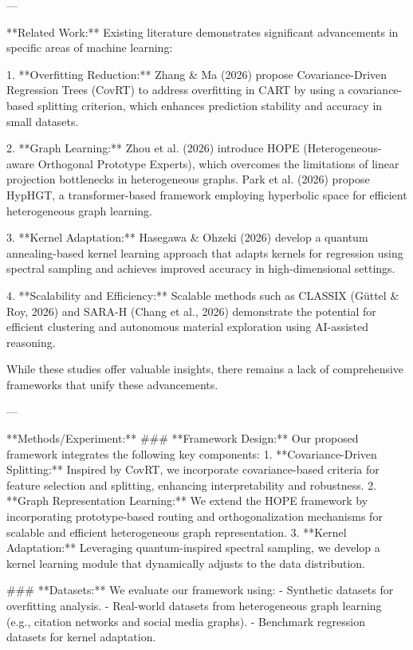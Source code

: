 ---

**Related Work:**  
Existing literature demonstrates significant advancements in specific areas of machine learning:  

1. **Overfitting Reduction:**  
Zhang & Ma (2026) propose Covariance-Driven Regression Trees (CovRT) to address overfitting in CART by using a covariance-based splitting criterion, which enhances prediction stability and accuracy in small datasets.  

2. **Graph Learning:**  
Zhou et al. (2026) introduce HOPE (Heterogeneous-aware Orthogonal Prototype Experts), which overcomes the limitations of linear projection bottlenecks in heterogeneous graphs. Park et al. (2026) propose HypHGT, a transformer-based framework employing hyperbolic space for efficient heterogeneous graph learning.  

3. **Kernel Adaptation:**  
Hasegawa & Ohzeki (2026) develop a quantum annealing-based kernel learning approach that adapts kernels for regression using spectral sampling and achieves improved accuracy in high-dimensional settings.  

4. **Scalability and Efficiency:**  
Scalable methods such as CLASSIX (Güttel & Roy, 2026) and SARA-H (Chang et al., 2026) demonstrate the potential for efficient clustering and autonomous material exploration using AI-assisted reasoning.  

While these studies offer valuable insights, there remains a lack of comprehensive frameworks that unify these advancements.  

---

**Methods/Experiment:**  
### **Framework Design:**  
Our proposed framework integrates the following key components:  
1. **Covariance-Driven Splitting:** Inspired by CovRT, we incorporate covariance-based criteria for feature selection and splitting, enhancing interpretability and robustness.  
2. **Graph Representation Learning:** We extend the HOPE framework by incorporating prototype-based routing and orthogonalization mechanisms for scalable and efficient heterogeneous graph representation.  
3. **Kernel Adaptation:** Leveraging quantum-inspired spectral sampling, we develop a kernel learning module that dynamically adjusts to the data distribution.  

### **Datasets:**  
We evaluate our framework using:  
- Synthetic datasets for overfitting analysis.  
- Real-world datasets from heterogeneous graph learning (e.g., citation networks and social media graphs).  
- Benchmark regression datasets for kernel adaptation.  

